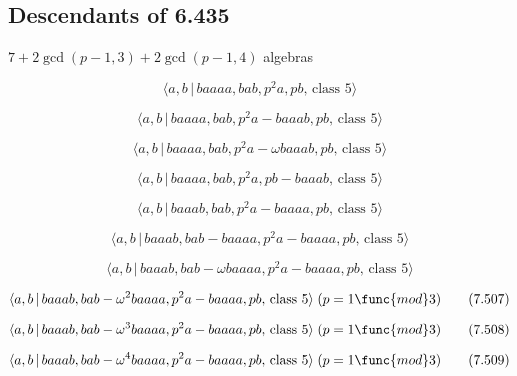 \documentclass[10pt]{article}
\begin{document}
\subsection{Descendants of 6.435}

$7+2\gcd (p-1,3)+2\gcd (p-1,4)$ algebras

\begin{equation}
\langle a,b\,|\,baaaa,bab,p^2a,pb,\,\text{class }5\rangle  \tag{7.500}
\end{equation}

\begin{equation}
\langle a,b\,|\,baaaa,bab,p^2a-baaab,pb,\,\text{class }5\rangle  \tag{7.501}
\end{equation}

\begin{equation}
\langle a,b\,|\,baaaa,bab,p^{2}a-\omega baaab,pb,\,\text{class }5\rangle 
\tag{7.502}
\end{equation}

\begin{equation}
\langle a,b\,|\,baaaa,bab,p^2a,pb-baaab,\,\text{class }5\rangle  \tag{7.503}
\end{equation}

\begin{equation}
\langle a,b\,|\,baaab,bab,p^2a-baaaa,pb,\,\text{class }5\rangle  \tag{7.504}
\end{equation}

\begin{equation}
\langle a,b\,|\,baaab,bab-baaaa,p^2a-baaaa,pb,\,\text{class }5\rangle 
\tag{7.505}
\end{equation}

\begin{equation}
\langle a,b\,|\,baaab,bab-\omega baaaa,p^{2}a-baaaa,pb,\,\text{class }%
5\rangle  \tag{7.506}
\end{equation}

\begin{equation}
\langle a,b\,|\,baaab,bab-\omega ^{2}baaaa,p^{2}a-baaaa,pb,\,\text{class }%
5\rangle \;(p=1\func{mod}3)  \tag{7.507}
\end{equation}

\begin{equation}
\langle a,b\,|\,baaab,bab-\omega ^{3}baaaa,p^{2}a-baaaa,pb,\,\text{class }%
5\rangle \;(p=1\func{mod}3)  \tag{7.508}
\end{equation}

\begin{equation}
\langle a,b\,|\,baaab,bab-\omega ^{4}baaaa,p^{2}a-baaaa,pb,\,\text{class }%
5\rangle \;(p=1\func{mod}3)  \tag{7.509}
\end{equation}
\end{document}
